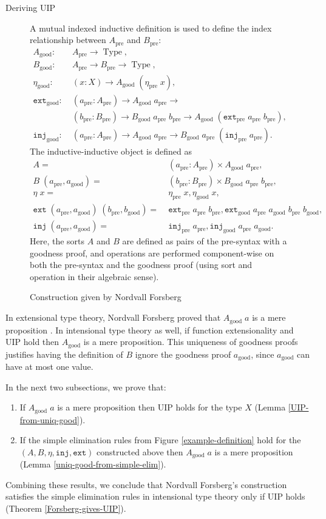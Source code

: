 \documentclass[runningheads]{llncs}
\DeclareMathOperator{\USet}{Type}
\newcommand{\pre}[1]{{#1}_\text{pre}}
\newcommand{\good}[1]{{#1}_\text{good}}
\newcommand{\join}{\texttt{ext}}
\newcommand{\inj}{\texttt{inj}}
\def\Forsberg/{Nordvall Forsberg}
\begin{document}
\begin{section}{Deriving UIP}
\begin{figure}[htpb]
\begin{flushleft}
A mutual indexed inductive definition is used to define the index relationship between $\pre{A}$ and $\pre{B}$:
\begin{align*}
\good{A}:&\; \pre{A}\to\USet,\\
\good{B}:&\; \pre{A}\to\pre{B}\to\USet,\\
\good{\eta}:&\; (x : X) \to \good{A}\;(\pre{\eta}\;x),\\
\good{\join}:&\; (\pre{a} : \pre{A})\to\good{A}\;\pre{a}\to\\&\;(\pre{b} : \pre{B})\to\good{B}\;\pre{a}\;\pre{b}\to\good{A}\;(\pre{\join}\;\pre{a}\;\pre{b}),\\
\good{\inj}:&\;(\pre{a}:\pre{A})\to\good{A}\;\pre{a}\to\good{B}\;\pre{a}\;(\pre{\inj}\;\pre{a}).
\end{align*}
The inductive-inductive object is defined as
\begin{align*}
A =&\; (\pre{a} : \pre{A})\times \good{A}\;\pre{a},\\
B\; (\pre{a},\good{a}) =&\; (\pre{b} : \pre{B})\times\good{B}\;\pre{a}\;\pre{b},\\
\eta\;x =&\;\pre{\eta}\;x,\good{\eta}\;x,\\
\join\;(\pre{a},\good{a})\;(\pre{b},\good{b})=&\; \pre{\join}\;\pre{a}\;\pre{b}, \good{\join}\;\pre{a}\;\good{a}\;\pre{b}\;\good{b},\\
\inj\;(\pre{a},\good{a})=&\;\pre{\inj}\;\pre{a}, \good{\inj}\;\pre{a}\;\good{a}.
\end{align*}
Here, the sorts $A$ and $B$ are defined as pairs of the pre-syntax with a goodness proof, and operations are performed component-wise on both the pre-syntax and the goodness proof (using sort and operation in their algebraic sense).
\end{flushleft}
\caption{\label{example-good-mutind}Construction given by \Forsberg/}
\end{figure}

In extensional type theory, \Forsberg/ proved that $\good{A}\;a$ is a mere proposition \citep[][Lemma 5.37(ii)]{nordvallforsberg2013thesis}. In intensional type theory as well, if function extensionality and UIP hold then $\good{A}$ is a mere proposition. This uniqueness of goodness proofs justifies having the definition of $B$ ignore the goodness proof $\good{a}$, since $\good{a}$ can have at most one value.

In the next two subsections, we prove that:
\begin{enumerate}
    \item If $\good{A}\;a$ is a mere proposition then UIP holds for the type $X$ (Lemma \ref{UIP-from-uniq-good}).
    \item If the simple elimination rules from Figure \ref{example-definition} hold for the $(A, B, \eta, \inj, \join)$ constructed above then $\good{A}\;a$ is a mere proposition (Lemma \ref{uniq-good-from-simple-elim}).
\end{enumerate}
Combining these results, we conclude that \Forsberg/'s construction satisfies the simple elimination rules in intensional type theory only if UIP holds (Theorem \ref{Forsberg-gives-UIP}).


\end{section}
\end{document}
